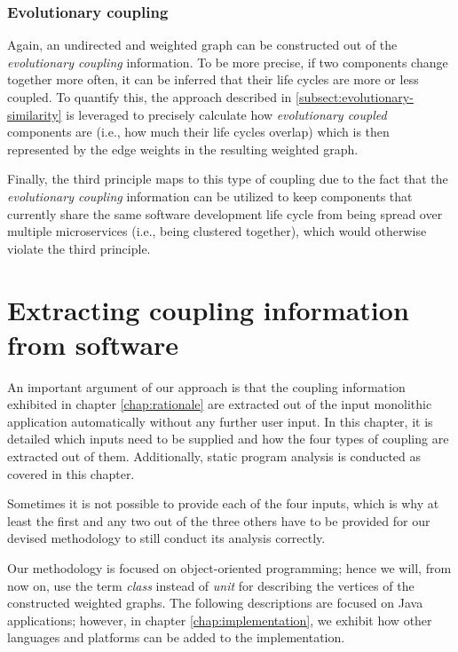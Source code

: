 \documentclass[12pt,a4paper]{report}
\begin{document}
\subsection{Evolutionary coupling}

Again, an undirected and weighted graph can be constructed out of the \textit{
evolutionary coupling} information. To be more precise, if two components
change together more often, it can be inferred that their life cycles are more
or less coupled. To quantify this, the approach described in
\ref{subsect:evolutionary-similarity} is leveraged to precisely calculate how
\textit{evolutionary coupled} components are (i.e., how much their life cycles overlap)
which is then represented by the edge weights in the resulting weighted graph.

Finally, the third principle maps to this type of coupling due to the fact that
the \textit{evolutionary coupling} information can be utilized to keep
components that currently share the same software development life cycle from
being spread over multiple microservices (i.e., being clustered together),
which would otherwise violate the third principle.




\chapter{Extracting coupling information from software} \label{chap:extracting-coupling}

An important argument of our approach is that the coupling information
exhibited in chapter \ref{chap:rationale} are extracted out of the input
monolithic application automatically without any further user input. In this
chapter, it is detailed which inputs need to be supplied and how the four
types of coupling are extracted out of them. Additionally, static program
analysis is conducted as covered in this chapter.

Sometimes it is not possible to provide each of the four inputs, which is why
at least the first and any two out of the three others have to be provided for
our devised methodology to still conduct its analysis correctly.

Our methodology is focused on object-oriented programming; hence we
will, from now on, use the term \textit{class} instead of \textit{unit} for
describing the vertices of the constructed weighted graphs.
The following descriptions are focused on Java applications; however, in chapter
\ref{chap:implementation}, we exhibit how other languages and platforms can be
added to the implementation.
\end{document}
